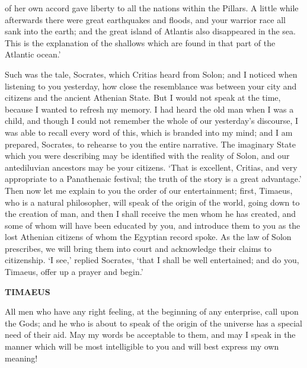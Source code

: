 \documentclass[11pt,letter]{article}
\begin{document}
of her own accord gave liberty to all the nations within the Pillars. A little while afterwards there were great earthquakes and floods, and your warrior race all sank into the earth; and the great island of Atlantis also disappeared in the sea. This is the explanation of the shallows which are found in that part of the Atlantic ocean.’

\par  Such was the tale, Socrates, which Critias heard from Solon; and I noticed when listening to you yesterday, how close the resemblance was between your city and citizens and the ancient Athenian State. But I would not speak at the time, because I wanted to refresh my memory. I had heard the old man when I was a child, and though I could not remember the whole of our yesterday’s discourse, I was able to recall every word of this, which is branded into my mind; and I am prepared, Socrates, to rehearse to you the entire narrative. The imaginary State which you were describing may be identified with the reality of Solon, and our antediluvian ancestors may be your citizens. ‘That is excellent, Critias, and very appropriate to a Panathenaic festival; the truth of the story is a great advantage.’ Then now let me explain to you the order of our entertainment; first, Timaeus, who is a natural philosopher, will speak of the origin of the world, going down to the creation of man, and then I shall receive the men whom he has created, and some of whom will have been educated by you, and introduce them to you as the lost Athenian citizens of whom the Egyptian record spoke. As the law of Solon prescribes, we will bring them into court and acknowledge their claims to citizenship. ‘I see,’ replied Socrates, ‘that I shall be well entertained; and do you, Timaeus, offer up a prayer and begin.’

\par \textbf{TIMAEUS}
\par   All men who have any right feeling, at the beginning of any enterprise, call upon the Gods; and he who is about to speak of the origin of the universe has a special need of their aid. May my words be acceptable to them, and may I speak in the manner which will be most intelligible to you and will best express my own meaning!
\end{document}
